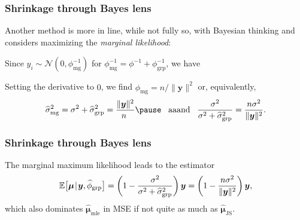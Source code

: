 \documentclass[18pt]{beamer}
\newcommand{\defineTightSpacing}{%
	\setlength{\abovedisplayskip}{.25\baselineskip}%
	\setlength{\belowdisplayskip}{.25\baselineskip}%
}
\newenvironment{tightEquation*}{%
	\defineTightSpacing%
	\begin{equation*}
}{
	\end{equation*} \ignorespacesafterend
}
\newcommand{\given}{\thinnerspace | \thinnerspace}
\newcommand{\diff}{\operatorname{\mathrm{d}}\!{}}
\newcommand{\thinnerspace}{\mskip.5\thinmuskip}
\newcommand{\expectation}{\mathbb{E}}
\newcommand{\normalDist}{\mathcal{N}}
\newcommand{\mle}[1]{\widehat{#1}_{\textrm{mle}}}
\newcommand{\density}{\pi}
\newcommand{\likelihood}{L}
\newcommand{\by}{\bm{y}}
\newcommand{\bmu}{\bm{\mu}}
\begin{document}
\begin{frame}
\frametitle{Shrinkage through Bayes lens}
Another method is more in line, while not fully so, with Bayesian thinking and considers maximizing the \textit{marginal likelihood}:

\pause
Since $y_i \sim \normalDist(0, \phi_{\mathrm{mg}}^{-1})$ for $\phi_{\mathrm{mg}}^{-1} = \phi^{-1} + \phi_{\mathrm{grp}}^{-1}$, we have
\begin{tightEquation*}
\end{tightEquation*}

\pause
\smallskip
Setting the derivative to $0$, we find $\widehat{\phi}_{\mathrm{mg}} = n / \| \by \|^2$ or, equivalently,
\begin{equation*} \defineTightSpacing%
\widehat{\sigma}_{\mathrm{mg}}^2 
	= \sigma^2 + \widehat{\sigma}_{\mathrm{grp}}^2
	= \frac{\| \by \|^2}{\!\!n} 
	\pause
	\ \, \text{ aaand } \ \,
\frac{\sigma^2}{\sigma^2 + \widehat{\sigma}_{\mathrm{grp}}^2}
	= \frac{n \sigma^2}{\| \by \|^2}.
\end{equation*}
\end{frame}


\begin{frame}
\frametitle{Shrinkage through Bayes lens}
\vspace{1.5\baselineskip}
The marginal maximum likelihood leads to the estimator
\begin{equation*} \defineTightSpacing%
\expectation\big[
	\bmu \given \by, \widehat{\phi}_{\mathrm{grp}}
\big]
	= \left( 1 - \frac{\sigma^2}{\sigma^2 + \widehat{\sigma}^2_{\mathrm{grp}}} \right) \by
	= \left( 1 - \frac{n \sigma^2}{\| \by \|^2} \right) \by,
\end{equation*}
which also dominates $\mle{\bmu}$ in {\small MSE} if not quite as much as $\widehat{\bmu}_{\mathrm{JS}}$.
\end{frame}
\end{document}
